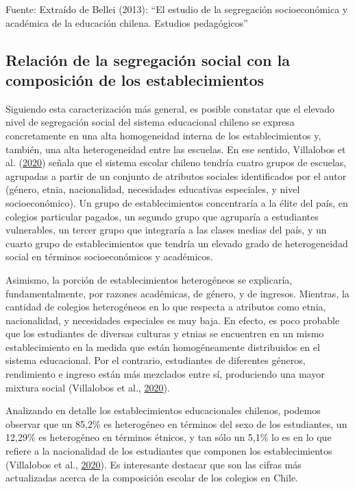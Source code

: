 \documentclass[
]{article}
\begin{document}
Fuente: Extraído de Bellei (2013): ``El estudio de la segregación
socioeconómica y académica de la educación chilena. Estudios
pedagógicos''

\hypertarget{relaciuxf3n-de-la-segregaciuxf3n-social-con-la-composiciuxf3n-de-los-establecimientos}{%
\subsection{Relación de la segregación social con la composición de los
establecimientos}\label{relaciuxf3n-de-la-segregaciuxf3n-social-con-la-composiciuxf3n-de-los-establecimientos}}

Siguiendo esta caracterización más general, es posible constatar que el
elevado nivel de segregación social del sistema educacional chileno se
expresa concretamente en una alta homogeneidad interna de los
establecimientos y, también, una alta heterogeneidad entre las escuelas.
En ese sentido, Villalobos et al.
(\protect\hyperlink{ref-villalobos_composicion_2020}{2020}) señala que
el sistema escolar chileno tendría cuatro grupos de escuelas, agrupadas
a partir de un conjunto de atributos sociales identificados por el autor
(género, etnia, nacionalidad, necesidades educativas especiales, y nivel
socioeconómico). Un grupo de establecimientos concentraría a la élite
del país, en colegios particular pagados, un segundo grupo que agruparía
a estudiantes vulnerables, un tercer grupo que integraría a las clases
medias del país, y un cuarto grupo de establecimientos que tendría un
elevado grado de heterogeneidad social en términos socioeconómicos y
académicos.

Asimismo, la porción de establecimientos heterogéneos se explicaría,
fundamentalmente, por razones académicas, de género, y de ingresos.
Mientras, la cantidad de colegios heterogéneos en lo que respecta a
atributos como etnia, nacionalidad, y necesidades especiales es muy
baja. En efecto, es poco probable que los estudiantes de diversas
culturas y etnias se encuentren en un mismo establecimiento en la medida
que están homogéneamente distribuidos en el sistema educacional. Por el
contrario, estudiantes de diferentes géneros, rendimiento e ingreso
están más mezclados entre sí, produciendo una mayor mixtura social
(Villalobos et al.,
\protect\hyperlink{ref-villalobos_composicion_2020}{2020}).

Analizando en detalle los establecimientos educacionales chilenos,
podemos observar que un 85,2\% es heterogéneo en términos del sexo de
los estudiantes, un 12,29\% es heterogéneo en términos étnicos, y tan
sólo un 5,1\% lo es en lo que refiere a la nacionalidad de los
estudiantes que componen los establecimientos (Villalobos et al.,
\protect\hyperlink{ref-villalobos_composicion_2020}{2020}). Es
interesante destacar que son las cifras más actualizadas acerca de la
composición escolar de los colegios en Chile.
\end{document}
